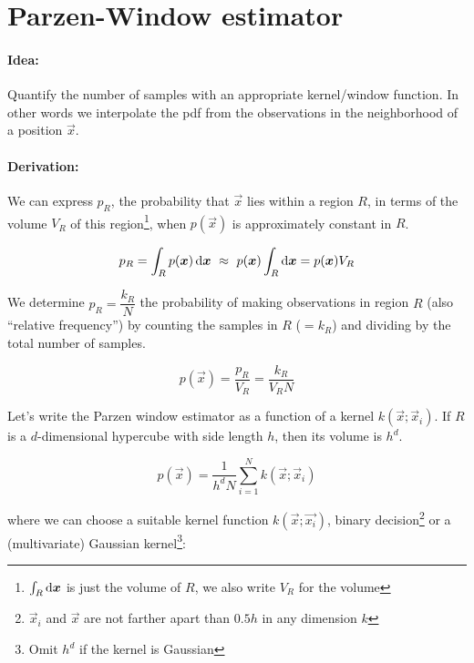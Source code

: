 
\section{Parzen-Window estimator}
\paragraph{Idea:} Quantify the number of samples with an appropriate kernel/window function. In other words we interpolate
the pdf from the observations in the neighborhood of a position $\vec{x}$.

\paragraph{Derivation:} We can express $p_R$, the probability that $\vec{x}$ lies within a region $R$, in terms of the volume $V_R$ of this region\footnote{$\int_R\mathop{}\!\mathrm{d}\bm{x}$ is just the volume of $R$, we also write $V_R$ for the volume}, when $p(\vec{x})$ is approximately constant in $R$.

\begin{equation*}
  p_R = \int_R p(\vec{x})\dif\vec{x} \ \approx \ p(\vec{x}) \int_R\dif\vec{x} = p(\vec{x}) V_R
\end{equation*}

We determine $p_R = \dfrac{k_R}{N}$ the probability of making observations in region $R$ (also ``relative frequency'')  by counting the samples in $R$ ($=k_R$) and dividing by the total number of samples.

\begin{equation*}
  p(\vec{x}) = \dfrac{p_R}{V_R} = \dfrac{k_R}{V_R N}
\end{equation*}

Let's write the Parzen window estimator as a function of a kernel $k(\vec{x}; \vec{x}_i)$. If $R$ is a $d$-dimensional hypercube with side length $h$, then its volume is $h^d$.

\begin{equation*}
  \boxed{p(\vec{x}) = \dfrac{1}{h^d N} \sum_{i=1}^N k(\vec{x}; \vec{x}_i)}
\end{equation*}

where we can choose a suitable kernel function $k(\vec{x}; \vec{x_i})$, \eg binary decision\footnote{$\vec{x}_i$ and $\vec{x}$ are not farther apart than $0.5 h$ in any dimension $k$} or a (multivariate) Gaussian kernel\footnote{Omit $h^d$ if the kernel is Gaussian}:

